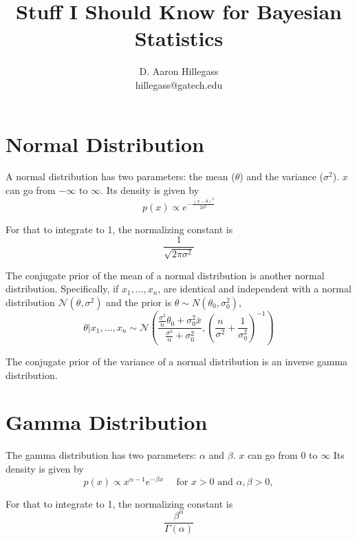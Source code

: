 \documentclass[12pt]{article}
\begin{document}
\title{Stuff I Should Know for Bayesian Statistics}
\author{D. Aaron Hillegass \\hillegass@gatech.edu}
\maketitle

\section*{Normal Distribution}

A normal distribution has two parameters: the mean ($\theta$) and the variance ($\sigma^2$). $x$ can go from $-\infty$ to $\infty$. Its density is given by
\begin{equation*}
p(x) \propto e^{-\frac{(x - \theta)^2}{2\sigma^2}}
\end{equation*}

For that to integrate to 1, the normalizing constant is
\begin{equation*}
\frac{1}{\sqrt{2\pi\sigma^2}}
\end{equation*}

The conjugate prior of the mean of a normal distribution is another normal distribution. Specifically, if $x_1, \dots, x_n$, are identical and independent with a normal distribution $\mathcal{N}(\theta, \sigma^2)$ and the prior is $\theta \sim  N(\theta_0, \sigma_0^2)$,
\begin{equation*}
\theta | x_1,\ldots,x_n \sim \mathcal{N}\left( \frac{\frac{\sigma^2}{n}\theta_0 + \sigma_0^2\bar{x}}{\frac{\sigma^2}{n}+\sigma_0^2},\left( \frac{n}{\sigma^2} + \frac{1}{\sigma_0^2} \right)^{-1} \right)
\end{equation*}

The conjugate prior of the variance of a normal distribution is an inverse gamma distribution.

\section*{Gamma Distribution}

The gamma distribution has two parameters: $\alpha$ and $\beta$. $x$ can go from $0$ to $\infty$ Its density is given by
\begin{equation*}
p(x) \propto   x^{\alpha-1} e^{-\beta x} \quad \text{ for } x > 0 \text{ and } \alpha, \beta > 0,
\end{equation*}

For that to integrate to 1, the normalizing constant is
\begin{equation*}
\frac{ \beta^\alpha}{\Gamma(\alpha)}
\end{equation*}
\end{document}
